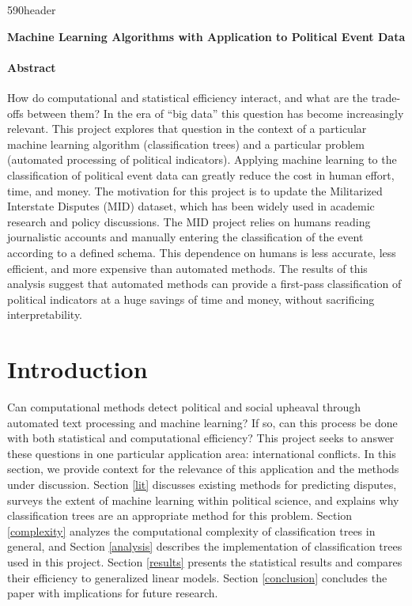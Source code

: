 \documentclass[12pt,letterpaper]{article}
\begin{document}
\cps590header

\vspace{1in}
\begin{center}
\textbf{Machine Learning Algorithms with Application to Political Event Data}
\end{center}

\vspace{1in}
\paragraph{Abstract} How do computational and statistical efficiency interact, and what are the trade-offs between them? In the era of ``big data'' this question has become increasingly relevant. This project explores that question in the context of a particular machine learning algorithm (classification trees) and a particular problem (automated processing of political indicators). Applying machine learning to the classification of political event data can greatly reduce the cost in human effort, time, and money. The motivation for this project is to update the Militarized Interstate Disputes (MID) dataset, which has been widely used in academic research and policy discussions. The MID project relies on humans reading journalistic accounts and manually entering the classification of the event according to a defined schema. This dependence on humans is less accurate, less efficient, and more expensive than automated methods. The results of this analysis suggest that automated methods can provide a first-pass classification of political indicators at a huge savings of time and money, without sacrificing interpretability. 


\pagebreak
\doublespacing

\section{Introduction} %

Can computational methods detect political and social upheaval through automated text processing and machine learning? If so, can this process be done with both statistical and computational efficiency? This project seeks to answer these questions in one particular application area: international conflicts. In this section, we provide context for the relevance of this application and the methods under discussion. Section \ref{lit} discusses existing methods for predicting disputes, surveys the extent of machine learning within political science, and explains why classification trees are an appropriate method for this problem. Section \ref{complexity} analyzes the computational complexity of classification trees in general, and Section \ref{analysis} describes the implementation of classification trees used in this project. Section \ref{results} presents the statistical results and compares their efficiency to generalized linear models. Section \ref{conclusion} concludes the paper with implications for future research. 
\end{document}
